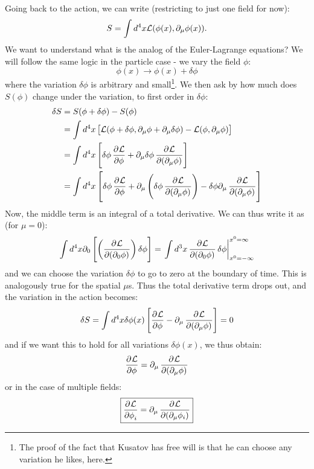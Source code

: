 Going back to the action, we can write (restricting to just one field for now):
\begin{equation}
    S = \int d^4x \mathcal{L}(\phi(x), \partial_\mu \phi(x)).
\end{equation}
We want to understand what is the analog of the Euler-Lagrange equations? We will follow the same logic in the particle case - we vary the field $\phi$:
\begin{equation}
    \phi(x) \to \phi(x) + \delta\phi
\end{equation}
where the variation $\delta\phi$ is arbitrary and small\footnote{The proof of the fact that Kusatov has free will is that he can choose any variation he likes, here.}. We then ask by how much does $S(\phi)$ change under the variation, to first order in $\delta \phi$:
\begin{equation}
    \begin{split}
        \delta S &= S(\phi + \delta \phi) - S(\phi) 
        \\ &= \int d^4x\left[\LL(\phi + \delta \phi, \p_\mu \phi + \p_\mu \delta \phi) - \LL(\phi, \p_\mu \phi)\right]
        \\ &= \int d^4x\left[\delta \phi \dpd{\LL}{\phi} + \p_\mu \delta\phi\dpd{\LL}{(\p_\mu \phi)}\right]
        \\ &= \int d^4x\left[\delta \phi \dpd{\LL}{\phi} + \p_\mu\left(\delta \phi \dpd{\LL}{(\p_\mu \phi)}\right) - \delta \phi \p_\mu \dpd{\LL}{(\p_\mu \phi)}\right]
    \end{split}
\end{equation}
Now, the middle term is an integral of a total derivative. We can thus write it as (for $\mu = 0$):
\begin{equation}
    \int d^4x \p_0\left[\left(\dpd{\LL}{(\p_0 \phi)}\right)\delta \phi\right] = \left.\int d^3 x \dpd{\LL}{(\p_0 \phi)}\delta\phi \right|_{x^0 = -\infty}^{x^0 = \infty}
\end{equation}
and we can choose the variation $\delta\phi$ to go to zero at the boundary of time. This is analogously true for the spatial $\mu$s. Thus the total derivative term drops out, and the variation in the action becomes:
\begin{equation}
    \delta S = \int d^4 x \delta \phi(x) \left[\dpd{\LL}{\phi} - \p_\mu \dpd{\LL}{(\p_\mu\phi)}\right] = 0
\end{equation}
and if we want this to hold for all variations $\delta \phi(x)$, we thus obtain:
\begin{equation}
    \dpd{\LL}{\phi} = \p_\mu\dpd{\LL}{(\p_\mu \phi)}
\end{equation}
or in the case of multiple fields:
\begin{equation}
    \boxed{\dpd{\LL}{\phi_i} = \p_\mu\dpd{\LL}{(\p_\mu \phi_i)}}
\end{equation}

